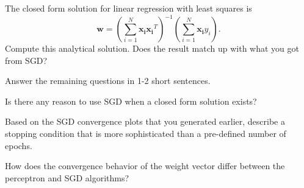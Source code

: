 \begin{problem}[2]
  The closed form solution for linear regression with least squares is \[\mathbf{w} = \left(\sum_{i=1}^N \mathbf{x_i}\mathbf{x_i}^T\right)^{-1}\left(\sum_{i=1}^N \mathbf{x_i}y_i\right).\]  Compute this analytical solution.  Does the result match up with what you got from SGD?
\end{problem}
\begin{solution}
 
\end{solution}

Answer the remaining questions in 1-2 short sentences.

\begin{problem}[2]
  Is there any reason to use SGD when a closed form solution exists?
\end{problem}
\begin{solution}
  
\end{solution}

\begin{problem}[2]
  Based on the SGD convergence plots that you generated earlier, describe a stopping condition that is more sophisticated than a pre-defined number of epochs.
\end{problem}
\begin{solution}
  
\end{solution}

\begin{problem}[2]
How does the convergence behavior of the weight vector differ between the perceptron and SGD algorithms?
\end{problem}
\begin{solution}
\end{solution}


